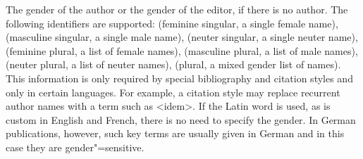 \documentclass{ltxdockit}[2011/03/25]
\begin{document}
\begin{fieldlist}

The gender of the author or the gender of the editor, if there is no author. The following identifiers are supported:  (feminine singular, a single female name),  (masculine singular, a single male name),  (neuter singular, a single neuter name),  (feminine plural, a list of female names),  (masculine plural, a list of male names),  (neuter plural, a list of neuter names),  (plural, a mixed gender list of names). This information is only required by special bibliography and citation styles and only in certain languages. For example, a citation style may replace recurrent author names with a term such as <idem>. If the Latin word is used, as is custom in English and French, there is no need to specify the gender. In German publications, however, such key terms are usually given in German and in this case they are gender"=sensitive.


\end{fieldlist}
\end{document}
